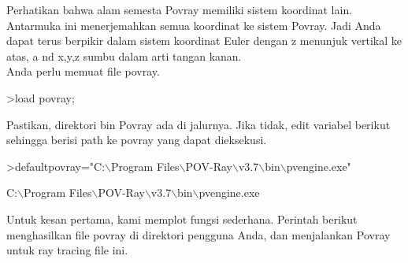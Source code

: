 \documentclass[a4paper,10pt]{article}
\begin{document}
\begin{eulernotebook}
\begin{eulercomment}
\begin{eulercomment}
\begin{eulercomment}
Perhatikan bahwa alam semesta Povray memiliki sistem koordinat lain.
Antarmuka ini menerjemahkan semua koordinat ke sistem Povray. Jadi
Anda dapat terus berpikir dalam sistem koordinat Euler dengan z
menunjuk vertikal ke atas, a nd x,y,z sumbu dalam arti tangan kanan.\\
Anda perlu memuat file povray.
\end{eulercomment}
\begin{eulerprompt}
>load povray;
\end{eulerprompt}
\begin{eulercomment}
Pastikan, direktori bin Povray ada di jalurnya. Jika tidak, edit
variabel berikut sehingga berisi path ke povray yang dapat dieksekusi.
\end{eulercomment}
\begin{eulerprompt}
>defaultpovray="C:\(\backslash\)Program Files\(\backslash\)POV-Ray\(\backslash\)v3.7\(\backslash\)bin\(\backslash\)pvengine.exe"
\end{eulerprompt}
\begin{euleroutput}
  C:\(\backslash\)Program Files\(\backslash\)POV-Ray\(\backslash\)v3.7\(\backslash\)bin\(\backslash\)pvengine.exe
\end{euleroutput}
\begin{eulercomment}
Untuk kesan pertama, kami memplot fungsi sederhana. Perintah berikut
menghasilkan file povray di direktori pengguna Anda, dan menjalankan
Povray untuk ray tracing file ini.


\end{eulercomment}
\end{eulercomment}
\end{eulercomment}
\end{eulernotebook}
\end{document}
